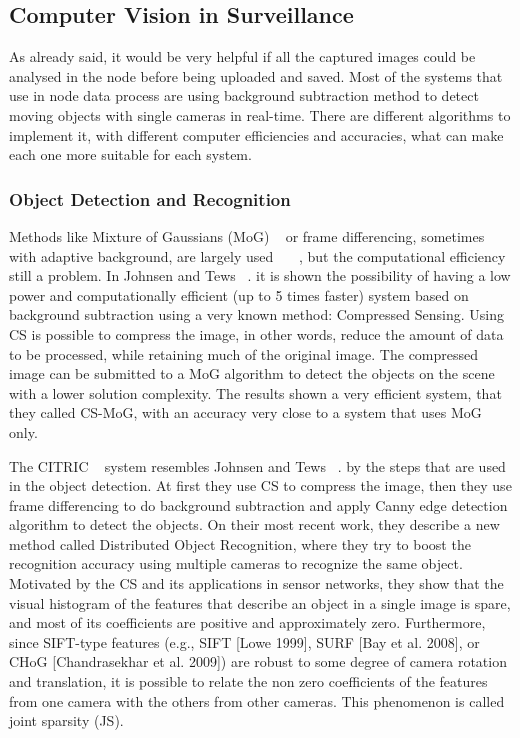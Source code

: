 \documentclass[journal,transmag]{IEEEtran}
\begin{document}
\subsection{Computer Vision in Surveillance}
As already said, it would be very helpful if all the captured images could be analysed in the node before being uploaded and saved. Most of the systems that use in node
data process are using background subtraction method to detect moving objects with single cameras in real-time. There are different algorithms to implement it, with 
different computer efficiencies and accuracies, what can make each one more suitable for each system.

\subsubsection{Object Detection and Recognition}
Methods like Mixture of Gaussians (MoG) ~\cite{CS-MoG} or frame differencing, sometimes with adaptive background, are largely used ~\cite{OmniEye}~\cite{SensEye}~\cite{MeshEye}, but 
the computational efficiency still a problem. In Johnsen and Tews ~\cite{Occlusion}. it is shown the possibility of having a low power and computationally efficient 
(up to 5 times faster) system based on  background subtraction using a very known method: Compressed Sensing. Using CS is possible to compress the image, in other words, reduce 
the amount of data to be processed, while retaining much of the original image. The compressed image can be submitted to a MoG algorithm to detect the objects on the scene with 
a lower solution complexity. The results shown a very efficient system, that they called CS-MoG, with an accuracy very close to a system that uses MoG only.

The CITRIC ~\cite{Citric} system resembles Johnsen and Tews ~\cite{Occlusion}. by the steps that are used in the object detection. At first they use CS to compress the image, 
then they use frame differencing to do background subtraction and apply Canny edge detection algorithm to detect the objects. On their most recent work, they describe a new 
method called Distributed Object Recognition, where they try to boost the recognition accuracy using multiple cameras to recognize the same object. Motivated by the CS and its
applications in sensor networks, they show that the visual histogram of the features that describe an object in a single image is spare, and most of its coefficients are positive
and approximately zero. Furthermore, since SIFT-type features (e.g., SIFT [Lowe 1999], SURF [Bay et al. 2008], or CHoG [Chandrasekhar et al. 2009]) are robust to some degree of 
camera rotation and translation, it is possible to relate the non zero coefficients of the features from one camera with the others from other cameras. This phenomenon is called 
joint sparsity (JS).
\end{document}
